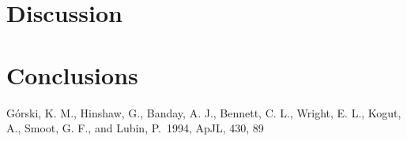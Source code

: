 \documentclass{emulateapj}
\begin{document}
\section{Discussion}
\label{sec:discussion}




\section{Conclusions}
\label{sec:conclusions}




%
%






\begin{acknowledgements}

\end{acknowledgements}

\begin{thebibliography}{}

 G{\'o}rski, K. M.,
  Hinshaw, G., Banday, A. J., Bennett, C. L., Wright, E. L., Kogut,
  A., Smoot, G. F., and Lubin, P.\ 1994, ApJL, 430, 89

\end{thebibliography}
\end{document}
